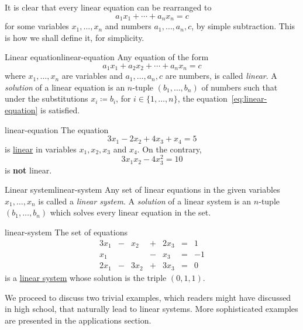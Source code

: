 It is clear that every linear equation can be rearranged to
\[
 a_1 x_1 + \cdots + a_n x_n = c
\]
for some variables $x_1,\ldots,x_n$ and numbers $a_1,\ldots,a_n,c$, by simple
subtraction. This is how we shall define it, for simplicity.

\begin{definition}{Linear equation}{linear-equation}
 Any equation of the form
 \begin{equation}
  \label{eq:linear-equation}
  a_1x_1 + a_2x_2 + \cdots + a_n x_n = c
 \end{equation}
 where $x_1,\ldots,x_n$ are variables and $a_1,\ldots,a_n,c$ are numbers, is
 called \emph{linear}. A \emph{solution} of a linear equation is an $n$-tuple
 $(b_1,\ldots,b_n)$ of numbers such that under the substitutions $x_i \coloneqq
 b_i$, for $i \in \{1,\ldots,n\}$, the equation~\eqref{eq:linear-equation} is
 satisfied.
\end{definition}

\begin{example}{}{linear-equation}
 The equation
 \[
  3x_1 - 2x_2 + 4x_3 + x_4 = 5
 \]
 is \hyperref[def:linear-equation]{linear} in variables $x_1,x_2,x_3$ and $x_4$.
 On the contrary,
 \[
  3x_1x_2 - 4x_3^2 = 10
 \]
 is \textbf{not} linear.
\end{example}

\begin{definition}{Linear system}{linear-system}
 Any set of linear equations in the given variables $x_1,\ldots,x_n$ is called a
 \emph{linear system}. A \emph{solution} of a linear system is an $n$-tuple
 $(b_1,\ldots,b_n)$ which solves every linear equation in the set.
\end{definition}

\begin{example}{}{linear-system}
 The set of equations
 \[
  \begin{array}{rcrcrcr}
   3x_1 & - & x_2 & + & 2x_3 &= &1\\
   x_1 & & & - & x_3 &= &-1 \\
   2x_1 & - & 3x_2 & + & 3x_3 & = & 0
  \end{array}
 \]
 is a \hyperref[def:linear-system]{linear system} whose solution is the triple
 $(0,1,1)$.
\end{example}

We proceed to discuss two trivial examples, which readers might have discussed
in high school, that naturally lead to linear systems. More sophisticated
examples are presented in the applications section.

